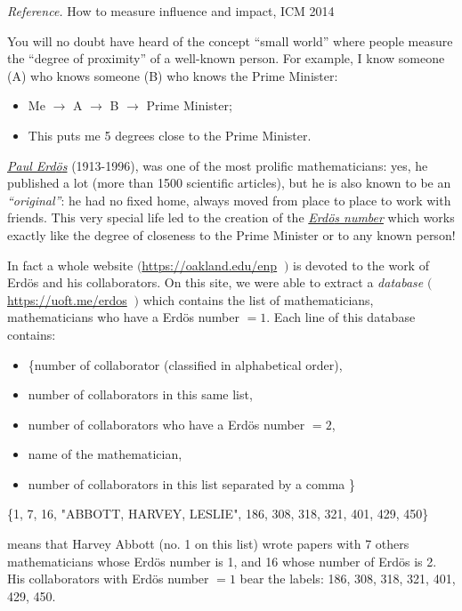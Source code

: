 \emph{Reference.} How to measure influence and impact, ICM 2014


You will no doubt have heard of the concept ``small world'' where people measure the ``degree of proximity'' of a well-known person. 
For example, I know someone (A) who knows someone (B) who knows  the Prime Minister:
\begin{itemize}
	\item Me $\to$ A $\to$ B $\to$ Prime Minister;
	\item This puts me 5 degrees close to the Prime Minister.
\end{itemize}



\href{https://www.wikipedia.org/wiki/Paul_Erdos}{\emph{Paul Erd{\"o}s}} (1913-1996), was one of the most prolific mathematicians: yes, he published a lot (more than 1500 scientific articles), but he is also known to be an \emph{``original''}: he had no fixed home, always moved from place to place to work with friends. This very special life led to the creation of the \href{https://www.wikipedia.org/wiki/Erdos_number}{\emph{Erd{\"o}s number}} which works exactly like the degree of closeness to the Prime Minister or to any known person! 

\begin{emphbox}[]
In fact a whole website $\bigg($\url{https://oakland.edu/enp}  $\ \bigg)$ is devoted to the work of Erd{\"o}s and his collaborators. On this site, we were able to extract a \emph{database} $\bigg($\url{https://uoft.me/erdos} $\ \bigg)$ which contains the list of mathematicians, mathematicians who have a Erd{\"o}s number $= 1$. Each line of this database contains:
\begin{itemize}
	\item \{number of collaborator (classified in alphabetical order),
	\item number of collaborators in this same list,
	\item number of collaborators who have a Erd{\"o}s number $= 2$,
	\item name of the mathematician, 
	\item number of collaborators in this list separated by a comma \}
\end{itemize}
\end{emphbox}

\begin{example}
\hfil \{1, 7, 16, "ABBOTT, HARVEY, LESLIE", 186, 308, 318, 321, 401, 429, 450\}

means that Harvey Abbott (no. 1 on this list) wrote papers with 7 others mathematicians whose Erd{\"o}s number is 1, and 16 whose number of Erd{\"o}s is 2. His collaborators with Erd{\"o}s number $= 1$ bear the labels: 186, 308, 318, 321, 401, 429, 450. 
\end{example}

